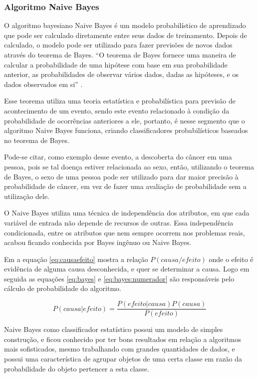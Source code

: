 \subsubsection{Algoritmo Naive Bayes}\label{cap:refTeor:sssec:nbayes}

O algoritmo bayesiano Naive Bayes é um modelo probabilístico de aprendizado que pode ser calculado diretamente entre seus dados de treinamento. Depois de calculado, o modelo pode ser utilizado para fazer previsões de novos dados através do teorema de Bayes. ``O teorema de Bayes fornece uma maneira de calcular a probabilidade de uma hipótese com base em sua probabilidade anterior, as probabilidades de observar vários dados, dadas as hipóteses, e os dados observados em si'' \cite[p. 156]{Mitchell1997}.



Esse teorema utiliza uma teoria estatística e probabilística para previsão de acontecimento de um evento, sendo este evento relacionado à condição da probabilidade de ocorrências anteriores a ele, portanto, é nesse segmento que o algoritmo Naive Bayes funciona, criando classificadores probabilísticos baseados no teorema de Bayes. 


Pode-se citar, como exemplo desse evento, a descoberta do câncer em uma pessoa, pois se tal doença estiver relacionada ao sexo, então, utilizando o teorema de Bayes, o sexo de uma pessoa pode ser utilizado para dar maior precisão à probabilidade de câncer, em vez de fazer uma avaliação de probabilidade sem a utilização dele.

O Naive Bayes utiliza uma técnica de independência dos atributos, em que cada variável de entrada não depende de recursos de outras. Essa independência condicionada, entre os atributos que nem sempre ocorrem nos problemas reais, acabou ficando conhecida por Bayes ingênuo ou Naive Bayes. 

Em  a equação \ref{eq:causaefeito} mostra a relação ${P(causa/efeito)}$ onde o efeito é evidência de alguma causa desconhecida, e quer se determinar a causa. Logo em seguida as equações \ref{eq:bayes} e \ref{eq:bayes:numerador} são responsáveis pelo cálculo de probabilidade do algoritmo.

\begin{equation} \label{eq:causaefeito}
 P(causa|efeito)= \frac{P(efeito|causa)P(causa)}{P(efeito)}
\end{equation}

Naive Bayes como classificador estatístico possui um modelo de simples construção, e ficou conhecido por ter bons resultados em relação a algoritmos mais sofisticados, mesmo trabalhando com grandes quantidades de dados, e possui uma característica de agrupar objetos de uma certa classe em razão da probabilidade do objeto pertencer a esta classe. 

